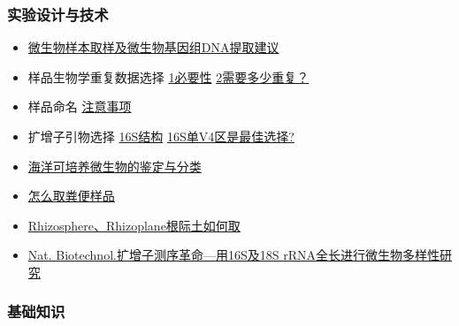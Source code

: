 \documentclass[]{article}
\providecommand{\tightlist}{%
  \setlength{\itemsep}{0pt}\setlength{\parskip}{0pt}}
\numberwithin{figure}{section}
\numberwithin{table}{section}
\begin{document}
\hypertarget{ux5b9eux9a8cux8bbeux8ba1ux4e0eux6280ux672f}{%
\subsubsection{实验设计与技术}\label{ux5b9eux9a8cux8bbeux8ba1ux4e0eux6280ux672f}}

\begin{itemize}
\tightlist
\item
  \href{http://mp.weixin.qq.com/s/L1XxsGDFt9wKk-4pSRwUUQ}{微生物样本取样及微生物基因组DNA提取建议}
\item
  样品生物学重复数据选择 \href{https://mp.weixin.qq.com/s/_qqeKbncKZmovajvPbskpA}{1必要性} \href{http://mp.weixin.qq.com/s/_qqeKbncKZmovajvPbskpA}{2需要多少重复？}
\item
  样品命名 \href{http://mp.weixin.qq.com/s/3-UlDWEwCvU5TUlu-_ezmg}{注意事项}
\item
  扩增子引物选择 \href{http://mp.weixin.qq.com/s/pBzh1LcdEy-EJop44z0mwA}{16S结构} \href{http://mp.weixin.qq.com/s/hMlfNQmXkt8o-ew_iSV30Q}{16S单V4区是最佳选择?}
\item
  \href{http://mp.weixin.qq.com/s/-0eqsE5slOyEcXFfjY7NNw}{海洋可培养微生物的鉴定与分类}
\item
  \href{http://mp.weixin.qq.com/s/fHwd2pc-E314JO_Ya4QEvQ}{怎么取粪便样品}
\item
  \href{http://mp.weixin.qq.com/s/6hOd-NV1TNXGQdxL0k9l0g}{Rhizosphere、Rhizoplane根际土如何取}
\item
  \href{http://mp.weixin.qq.com/s/vUtQmuj1vIoH9L0J-YT5fQ}{Nat. Biotechnol.扩增子测序革命---用16S及18S rRNA全长进行微生物多样性研究}
\end{itemize}

\hypertarget{ux57faux7840ux77e5ux8bc6}{%
\subsubsection{基础知识}\label{ux57faux7840ux77e5ux8bc6}}
\end{document}
